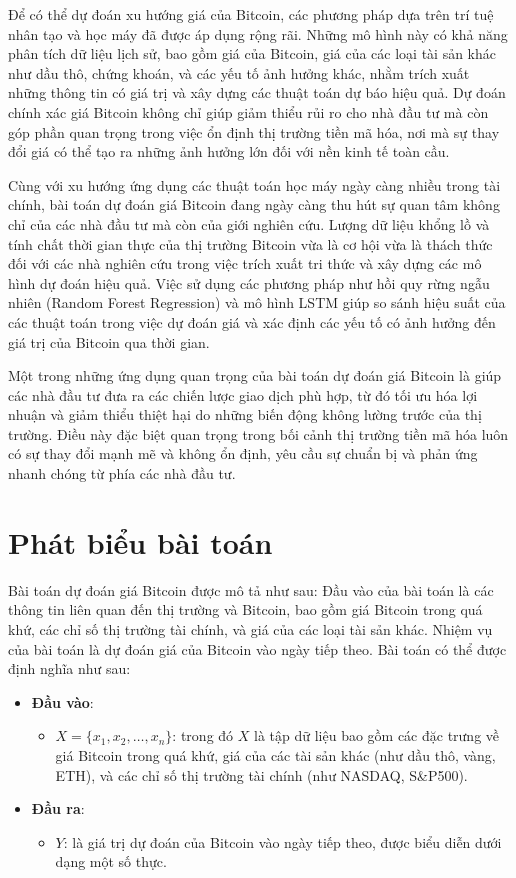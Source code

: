 Để có thể dự đoán xu hướng giá của Bitcoin, các phương pháp dựa trên trí tuệ nhân tạo và học máy đã được áp dụng rộng rãi. Những mô hình này có khả năng phân tích dữ liệu lịch sử, bao gồm giá của Bitcoin, giá của các loại tài sản khác như dầu thô, chứng khoán, và các yếu tố ảnh hưởng khác, nhằm trích xuất những thông tin có giá trị và xây dựng các thuật toán dự báo hiệu quả. Dự đoán chính xác giá Bitcoin không chỉ giúp giảm thiểu rủi ro cho nhà đầu tư mà còn góp phần quan trọng trong việc ổn định thị trường tiền mã hóa, nơi mà sự thay đổi giá có thể tạo ra những ảnh hưởng lớn đối với nền kinh tế toàn cầu.

Cùng với xu hướng ứng dụng các thuật toán học máy ngày càng nhiều trong tài chính, bài toán dự đoán giá Bitcoin đang ngày càng thu hút sự quan tâm không chỉ của các nhà đầu tư mà còn của giới nghiên cứu. Lượng dữ liệu khổng lồ và tính chất thời gian thực của thị trường Bitcoin vừa là cơ hội vừa là thách thức đối với các nhà nghiên cứu trong việc trích xuất tri thức và xây dựng các mô hình dự đoán hiệu quả. Việc sử dụng các phương pháp như hồi quy rừng ngẫu nhiên (Random Forest Regression) và mô hình LSTM giúp so sánh hiệu suất của các thuật toán trong việc dự đoán giá và xác định các yếu tố có ảnh hưởng đến giá trị của Bitcoin qua thời gian.

Một trong những ứng dụng quan trọng của bài toán dự đoán giá Bitcoin là giúp các nhà đầu tư đưa ra các chiến lược giao dịch phù hợp, từ đó tối ưu hóa lợi nhuận và giảm thiểu thiệt hại do những biến động không lường trước của thị trường. Điều này đặc biệt quan trọng trong bối cảnh thị trường tiền mã hóa luôn có sự thay đổi mạnh mẽ và không ổn định, yêu cầu sự chuẩn bị và phản ứng nhanh chóng từ phía các nhà đầu tư.

\section{Phát biểu bài toán}
Bài toán dự đoán giá Bitcoin  được mô tả như sau: Đầu vào của bài toán là các thông tin liên quan đến thị trường và Bitcoin, bao gồm giá Bitcoin trong quá khứ, các chỉ số thị trường tài chính, và giá của các loại tài sản khác. Nhiệm vụ của bài toán là dự đoán giá của Bitcoin vào ngày tiếp theo. Bài toán có thể được định nghĩa như sau:

\begin{itemize}
    \item \textbf{Đầu vào}: 
    \begin{itemize}
        \item $X = \{x_1, x_2, \dots, x_n\}$: trong đó $X$ là tập dữ liệu bao gồm các đặc trưng về giá Bitcoin trong quá khứ, giá của các tài sản khác (như dầu thô, vàng, ETH), và các chỉ số thị trường tài chính (như NASDAQ, S\&P500).
    \end{itemize}
    \item \textbf{Đầu ra}: 
    \begin{itemize}
        \item $Y$: là giá trị dự đoán của Bitcoin vào ngày tiếp theo, được biểu diễn dưới dạng một số thực.
    \end{itemize}
\end{itemize}

